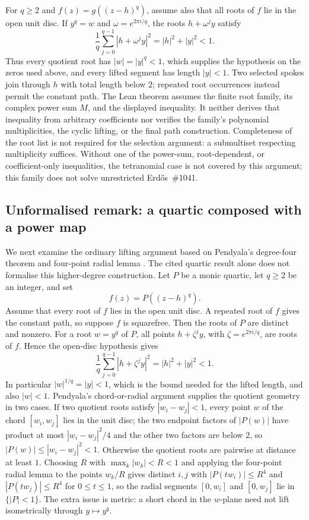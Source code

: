 \documentclass[11pt]{article}
\begin{document}
For $q\ge2$ and $f(z)=g((z-h)^q)$, assume also that all roots of $f$
lie in the open unit disc. If $y^q=w$ and $\omega=e^{2\pi i/q}$, the
roots $h+\omega^j y$ satisfy
\[
 \frac1q\sum_{j=0}^{q-1}|h+\omega^j y|^2=|h|^2+|y|^2<1.
\]
Thus every quotient root has $|w|=|y|^q<1$, which supplies the
hypothesis on the zeros used above, and every lifted segment has length
$|y|<1$. Two selected spokes join through $h$ with total length below
$2$; repeated root occurrences instead permit the constant path.
The Lean theorem assumes the finite root family, its complex power sum $M$,
and the displayed inequality. It neither derives that inequality from
arbitrary coefficients nor verifies the family's polynomial
multiplicities, the cyclic lifting, or the final path construction.
Completeness of the root list is not required for the selection argument:
a submultiset respecting multiplicity suffices.  Without one of the power-sum, root-dependent, or coefficient-only
inequalities, the tetranomial case is not covered by this argument; this family does not solve
unrestricted Erd\H{o}s~\#1041.

\subsection*{Unformalised remark: a quartic composed with a power map}\label{sec:translated-quartic-quotient-fibres}

We next examine the ordinary lifting argument based on Pendyala's
degree-four theorem \cite[Theorem~1]{june2026} and four-point radial
lemma \cite[Lemma~1]{june2026}. The cited quartic result alone does not
formalise this higher-degree construction. Let $P$ be a monic quartic,
let $q\ge2$ be an integer, and set
\[
  f(z)=P((z-h)^q).
\]
Assume that every root of $f$ lies in the open unit disc.
A repeated root of $f$ gives the constant path, so suppose $f$ is
squarefree. Then the roots of $P$ are distinct and nonzero. For a root
$w=y^q$ of $P$, all points $h+\zeta^j y$, with $\zeta=e^{2\pi i/q}$,
are roots of $f$. Hence the open-disc hypothesis gives
\[
 \frac1q\sum_{j=0}^{q-1}|h+\zeta^jy|^2=|h|^2+|y|^2<1.
\]
In particular $|w|^{1/q}=|y|<1$, which is the bound needed for the
lifted length, and also $|w|<1$. Pendyala's chord-or-radial argument
supplies the quotient geometry in two cases.  If two quotient roots satisfy
$|w_i-w_j|<1$, every point $w$ of the chord $[w_i,w_j]$ lies in the unit disc;
the two endpoint factors of $|P(w)|$ have product at most $|w_i-w_j|^2/4$ and
the other two factors are below $2$, so $|P(w)|\le|w_i-w_j|^2<1$.  Otherwise
the quotient roots are pairwise at distance at least $1$.  Choosing $R$ with
$\max_k|w_k|<R<1$ and applying the four-point radial lemma to the points
$w_k/R$ gives distinct $i,j$ with $|P(tw_i)|\le R^4$ and $|P(tw_j)|\le R^4$ for
$0\le t\le1$, so the radial segments $[0,w_i]$ and $[0,w_j]$ lie in
$\{|P|<1\}$.  The extra issue is metric: a short chord in the
$w$-plane need not lift isometrically through $y\mapsto y^q$.
\end{document}
